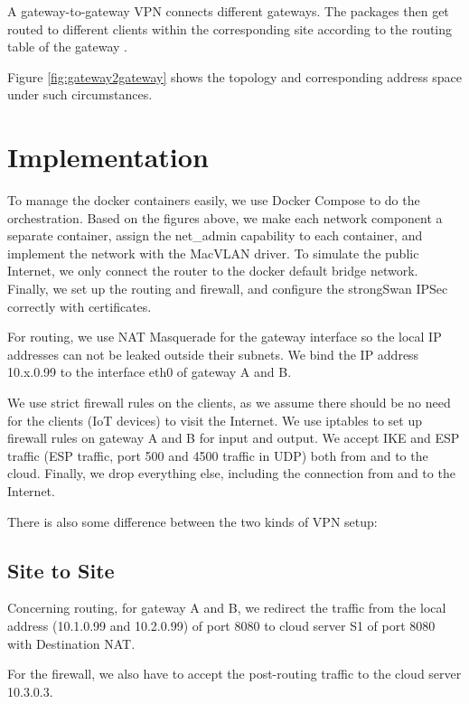 \documentclass[article]{aaltoseries}
\begin{document}
A gateway-to-gateway VPN connects different gateways. The packages then get routed to different clients within the corresponding site according to the routing table of the gateway \cite{dulany2006performance}.

Figure \ref{fig:gateway2gateway} shows the topology and corresponding address space under such circumstances.



\section{Implementation}

To manage the docker containers easily, we use Docker Compose to do the orchestration. Based on the figures above, we make each network component a separate container, assign the net\_admin capability to each container, and implement the network with the MacVLAN driver. To simulate the public Internet, we only connect the router to the docker default bridge network. Finally, we set up the routing and firewall, and configure the strongSwan IPSec correctly with certificates.

For routing, we use NAT Masquerade for the gateway interface so the local IP addresses can not be leaked outside their subnets. We bind the IP address 10.x.0.99 to the interface eth0 of gateway A and B.

We use strict firewall rules on the clients, as we assume there should be no need for the clients (IoT devices) to visit the Internet. We use iptables to set up firewall rules on gateway A and B for input and output. We accept IKE and ESP traffic (ESP traffic, port 500 and 4500 traffic in UDP) both from and to the cloud. Finally, we drop everything else, including the connection from and to the Internet.

There is also some difference between the two kinds of VPN setup:

\subsection{Site to Site}

Concerning routing, for gateway A and B, we redirect the traffic from the local address (10.1.0.99 and 10.2.0.99) of port 8080 to cloud server S1 of port 8080 with Destination NAT.

For the firewall, we also have to accept the post-routing traffic to the cloud server 10.3.0.3.
\end{document}
